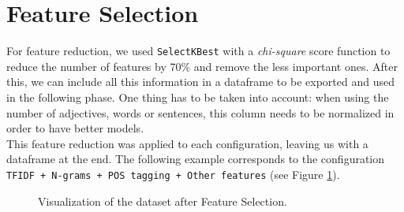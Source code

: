 \section{Feature Selection}
For feature reduction, we used \texttt{SelectKBest} with a \textit{chi-square} score function to reduce the number of features by 70\% and remove the less important ones. After this, we can include all this information in a dataframe to be exported and used in the following phase. One thing has to be taken into account: when using the number of adjectives, words or sentences, this column needs to be normalized in order to have better models.\\

This feature reduction was applied to each configuration, leaving us with a dataframe at the end. The following example corresponds to the configuration \texttt{TFIDF + N-grams + POS tagging + Other features} (see Figure \ref{Figure_FeatureSelection_01}).

\begin{figure}[h!]
	\centering
	\caption{Visualization of the dataset after Feature Selection.}
	\label{Figure_FeatureSelection_01}
\end{figure}

\newpage